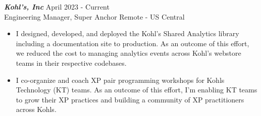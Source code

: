\textsl {\textbf{Kohl's, Inc}} \hfill April 2023 - Current \\ Engineering Manager, Super Anchor \hfill Remote - US Central
\begin{itemize}
    \item I designed, developed, and deployed the Kohl's Shared Analytics library including a documentation site to production. As an outcome of this effort, we reduced the cost to managing analytics events across Kohl's webstore teams in their respective codebases.
    \item I co-organize and coach XP pair programming workshops for Kohls Technology (KT) teams. As an outcome of this effort, I'm enabling KT teams to grow their XP practices and building a community of XP practitioners across Kohls.
\end{itemize}